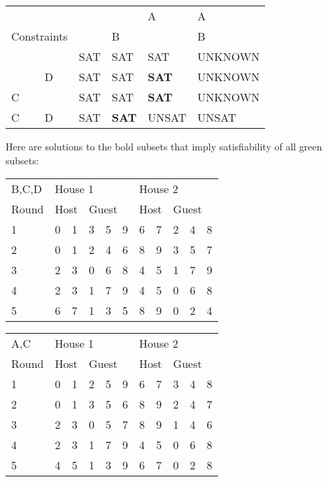 \documentclass{scrartcl}
\begin{document}
\begin{itemize}
\begin{tabular}{ll|llll}
\multicolumn{2}{l|}{} & & & A & A \\
\multicolumn{2}{l|}{\multirow{-2}{*}{Constraints}} & & B & & B \\ \hline
 & & \cellcolor{green!50}SAT & \cellcolor{green!50}SAT & \cellcolor{green!50}SAT & \cellcolor{yellow!50}UNKNOWN \\
 & D & \cellcolor{green!50}SAT & \cellcolor{green!50}SAT & \cellcolor{green!50}\textbf{SAT} & \cellcolor{yellow!50}UNKNOWN \\
C & & \cellcolor{green!50}SAT & \cellcolor{green!50}SAT & \cellcolor{green!50}\textbf{SAT} & \cellcolor{yellow!50}UNKNOWN \\
C & D & \cellcolor{green!50}SAT & \cellcolor{green!50}\textbf{SAT} & \cellcolor{red!50}UNSAT & \cellcolor{red!50}UNSAT 
\end{tabular}

Here are solutions to the bold subsets that imply satisfiability of all green subsets:\\

\begin{tabular}{l|ll|lll|ll|lll}
B,C,D & \multicolumn{5}{l|}{House 1} & \multicolumn{5}{l}{House 2} \\
Round & \multicolumn{2}{l}{Host} & \multicolumn{3}{l|}{Guest} & \multicolumn{2}{l}{Host} & \multicolumn{3}{l}{Guest} \\ \hline
1 & 0 & 1 & 3 & 5 & 9 & 6 & 7 & 2 & 4 & 8 \\
2 & 0 & 1 & 2 & 4 & 6 & 8 & 9 & 3 & 5 & 7 \\
3 & 2 & 3 & 0 & 6 & 8 & 4 & 5 & 1 & 7 & 9 \\
4 & 2 & 3 & 1 & 7 & 9 & 4 & 5 & 0 & 6 & 8 \\
5 & 6 & 7 & 1 & 3 & 5 & 8 & 9 & 0 & 2 & 4 \\
\end{tabular}

\begin{tabular}{l|ll|lll|ll|lll}
A,C & \multicolumn{5}{l|}{House 1} & \multicolumn{5}{l}{House 2} \\
Round & \multicolumn{2}{l}{Host} & \multicolumn{3}{l|}{Guest} & \multicolumn{2}{l}{Host} & \multicolumn{3}{l}{Guest} \\ \hline
1 & 0 & 1 & 2 & 5 & 9 & 6 & 7 & 3 & 4 & 8 \\
2 & 0 & 1 & 3 & 5 & 6 & 8 & 9 & 2 & 4 & 7 \\
3 & 2 & 3 & 0 & 5 & 7 & 8 & 9 & 1 & 4 & 6 \\
4 & 2 & 3 & 1 & 7 & 9 & 4 & 5 & 0 & 6 & 8 \\
5 & 4 & 5 & 1 & 3 & 9 & 6 & 7 & 0 & 2 & 8 \\
\end{tabular}


\end{itemize}
\end{document}
